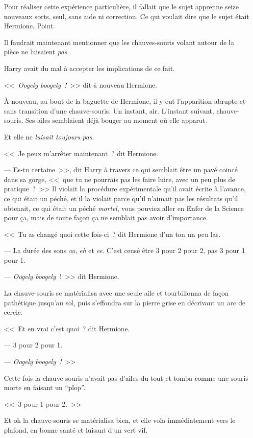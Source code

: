 Pour réaliser cette expérience particulière, il fallait que le sujet apprenne seize nouveaux sorts, seul, sans aide ni correction. Ce qui voulait dire que le sujet était Hermione. Point.

Il faudrait maintenant mentionner que les chauves-souris volant autour de la pièce ne luisaient \emph{pas}.

Harry avait du mal à accepter les implications de ce fait.

<<~\emph{Oogely boogely~!}~>> dit à nouveau Hermione.

À nouveau, au bout de la baguette de Hermione, il y eut l'apparition abrupte et sans transition d'une chauve-souris. Un instant, air. L'instant suivant, chauve-souris. Ses ailes semblaient déjà bouger au moment où elle apparut.

Et elle ne \emph{luisait toujours pas}.

<<~Je peux m'arrêter maintenant~? dit Hermione.

--- Es-tu certaine~>>, dit Harry à travers ce qui semblait être un pavé coincé dans sa gorge, <<~que tu ne pourrais pas les faire luire, avec un peu plus de pratique~?~>> Il violait la procédure expérimentale qu'il avait écrite à l'avance, ce qui était un péché, et il la violait parce qu'il n'aimait pas les résultats qu'il obtenait, ce qui était un péché \emph{mortel}, vous pouviez aller en Enfer de la Science pour ça, mais de toute façon ça ne semblait pas avoir d'importance.

<<~Tu as changé quoi cette fois-ci~? dit Hermione d'un ton un peu las.

--- La durée des sons \emph{oo}, \emph{eh} et \emph{ee}. C'est censé être 3 pour 2 pour 2, pas 3 pour 1 pour 1.

--- \emph{Oogely boogely}~!~>> dit Hermione.

La chauve-souris se matérialisa avec une seule aile et tourbillonna de façon pathétique jusqu'au sol, puis s'effondra sur la pierre grise en décrivant un arc de cercle.

<<~Et en vrai c'est quoi~? dit Hermione.

--- 3 pour 2 pour 1.

--- \emph{Oogely boogely~!}~>>

Cette fois la chauve-souris n'avait pas d'ailes du tout et tomba comme une souris morte en faisant un “plop”.

<<~3 pour 1 pour 2.~>>

Et oh la chauve-souris se matérialisa bien, et elle vola immédiatement vers le plafond, en bonne santé et luisant d'un vert vif.

